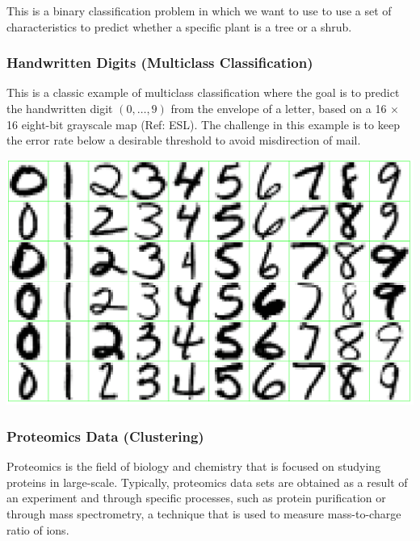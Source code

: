 \documentclass[
]{book}
\begin{document}
This is a binary classification problem in which we want to use to use a set of characteristics to predict whether a specific plant is a tree or a shrub.

\subsubsection*{\texorpdfstring{ Handwritten Digits (Multiclass Classification) }{ Handwritten Digits (Multiclass Classification) }}\label{handwritten-digits-multiclass-classification}

This is a classic example of multiclass classification where the goal is to predict the handwritten digit \((0, \ldots, 9)\) from the envelope of a letter, based on a 16 \(\times\) 16 eight-bit grayscale map (Ref: ESL). The challenge in this example is to keep the error rate below a desirable threshold to avoid misdirection of mail.

\begin{center}\includegraphics[width=0.75\linewidth]{images/week1/SLEx_digits} \end{center}

\subsubsection*{\texorpdfstring{ Proteomics Data (Clustering) }{ Proteomics Data (Clustering) }}\label{proteomics-data-clustering}

Proteomics is the field of biology and chemistry that is focused on studying proteins in large-scale. Typically, proteomics data sets are obtained as a result of an experiment and through specific processes, such as protein purification or through mass spectrometry, a technique that is used to measure mass-to-charge ratio of ions.
\end{document}
